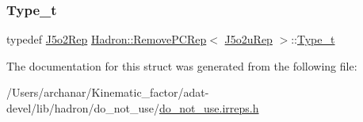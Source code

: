 \mbox{\label{structHadron_1_1RemovePCRep_3_01J5o2uRep_01_4_a374ffbe381e7e02b182dabe0c22a5213}} 
\subsubsection{\texorpdfstring{Type\_t}{Type\_t}\hspace{0.1cm}{\footnotesize\ttfamily [2/2]}}
{\footnotesize\ttfamily typedef \mbox{\hyperlink{structHadron_1_1J5o2Rep}{J5o2\+Rep}} \mbox{\hyperlink{structHadron_1_1RemovePCRep}{Hadron\+::\+Remove\+P\+C\+Rep}}$<$ \mbox{\hyperlink{structHadron_1_1J5o2uRep}{J5o2u\+Rep}} $>$\+::\mbox{\hyperlink{structHadron_1_1RemovePCRep_3_01J5o2uRep_01_4_a374ffbe381e7e02b182dabe0c22a5213}{Type\+\_\+t}}}



The documentation for this struct was generated from the following file\+:\begin{DoxyCompactItemize}
\item 
/\+Users/archanar/\+Kinematic\+\_\+factor/adat-\/devel/lib/hadron/do\+\_\+not\+\_\+use/\mbox{\hyperlink{adat-devel_2lib_2hadron_2do__not__use_2do__not__use_8irreps_8h}{do\+\_\+not\+\_\+use.\+irreps.\+h}}\end{DoxyCompactItemize}
